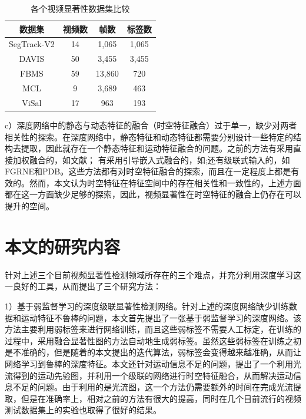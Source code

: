 \begin{table}[]
\caption{各个视频显著性数据集比较}
\label{table1}
\center
\vspace{5pt}
\begin{tabular}{|c|c|c|c|}
\hline
\textbf{数据集} & 视频数 & 帧数      & 标签数    \\ \hline
SegTrack-V2 \cite{li2013video}      & 14    & 1,065  & 1,065 \\ \hline
DAVIS \cite{perazzi2016benchmark}            & 50    & 3,455  & 3,455 \\ \hline
FBMS \cite{ochs2013segmentation}            & 59    & 13,860 & 720   \\ \hline
MCL \cite{7091884}              & 9     & 3,689  & 463   \\ \hline
ViSal \cite{ViSalWang}            & 17    & 963    & 193   \\ \hline
\end{tabular}
\end{table}

c）深度网络中的静态与动态特征的融合（时空特征融合）过于单一，缺少对两者相关性的探索。在深度网络中，静态特征和动态特征都需要分别设计一些特定的结构去提取，因此就存在一个静态特征和运动特征融合的问题。之前的方法有采用直接加权融合的，如文献\cite{Kalboussi2017A}； 有采用引导嵌入式融合的，如\cite{8047320};还有级联式输入的，如FGRNE\cite{li2018flow}和PDB\cite{song2018pyramid}。这些方法都有对时空特征融合的探索，而且在一定程度上都是有效的。然而，本文认为时空特征在特征空间中的存在相关性和一致性的，上述方面都在这一方面缺少足够的探索，因此，视频显著性在时空特征的融合上仍存在可以提升的空间。
\section{本文的研究内容}

针对上述三个目前视频显著性检测领域所存在的三个难点，并充分利用深度学习这一良好的工具，从而提出了三个研究方法：

1）基于弱监督学习的深度级联显著性检测网络。针对上述的深度网络缺少训练数据和运动特征不鲁棒的问题，本文首先提出了一张基于弱监督学习的深度网络。该方法主要利用弱标签来进行网络训练，而且这些弱标签不需要人工标定，在训练的过程中，采用融合显著性图的方法自动地生成弱标签。虽然这些弱标签在训练之初是不准确的，但是随着的本文提出的迭代算法，弱标签会变得越来越准确，从而让网络学习到鲁棒的深度特征。本文还针对运动信息不足的问题，提出了一个利用光流得到的运动先验图，并利用一个级联的网络进行时空特征融合，从而解决运动信息不足的问题。由于利用的是光流图，这一个方法仍需要额外的时间在完成光流提取，但是在准确率上，相对之前的方法有很大的提高，同时在几个目前流行的视频测试数据集上的实验也取得了很好的结果。

